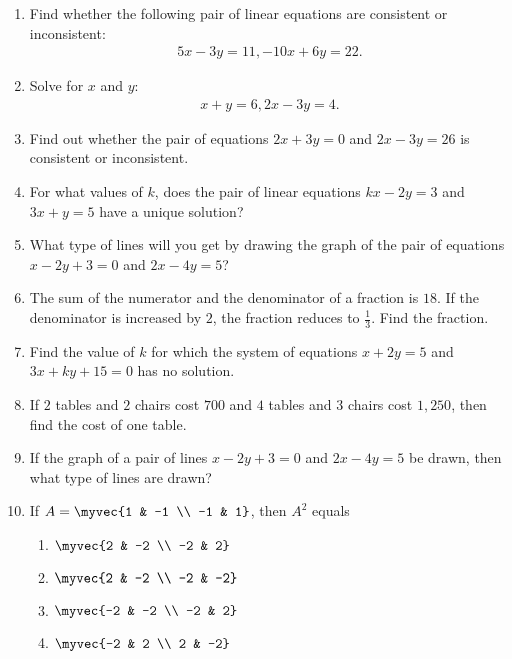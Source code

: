 \documentclass{article}
\begin{document}
\begin{enumerate}
    \item Find whether the following pair of linear equations are consistent or inconsistent:
    \begin{align*}
     5x - 3y = 11, -10x + 6y = 22.
    \end{align*}
    \item Solve for $x$ and $y$:
    \begin{align*}
    x + y = 6, 2x - 3y = 4.
    \end{align*}
    \item Find out whether the pair of equations $2x + 3y = 0$ and $2x - 3y = 26$ is consistent or inconsistent.
    
    \item For what values of $k$, does the pair of linear equations $kx - 2y = 3$ and $3x + y = 5$ have a unique solution?
    
    \item What type of lines will you get by drawing the graph of the pair of equations $x - 2y + 3 = 0$ and $2x - 4y = 5$?
    
    \item The sum of the numerator and the denominator of a fraction is $18$. If the denominator is increased by $2$, the fraction reduces to $\frac{1}{3}$. Find the fraction.
    
    \item Find the value of $k$ for which the system of equations $x + 2y = 5$ and $3x + ky + 15 = 0$ has no solution.
    
    \item If $2$ tables and $2$ chairs cost \rupee $700$ and $4$ tables and $3$ chairs cost \rupee $1,250$, then find the cost of one table.
    
    \item If the graph of a pair of lines $x - 2y + 3 = 0$ and $2x - 4y = 5$ be drawn, then what type of lines are drawn?

    \item If $A = \myvec{1 & -1 \\ -1 & 1}$, then $A^2$ equals
    \begin{enumerate}
        \item $\myvec{2 & -2 \\ -2 & 2}$
        \item $\myvec{2 & -2 \\ -2 & -2}$
        \item $\myvec{-2 & -2 \\ -2 & 2}$
        \item $\myvec{-2 & 2 \\ 2 & -2}$
    \end{enumerate}


\end{enumerate}
\end{document}
